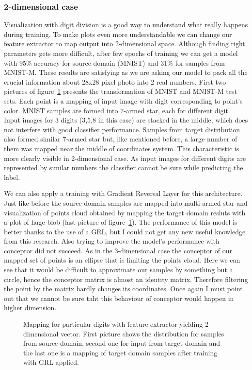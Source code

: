 \documentclass{article}
\begin{document}
\subsubsection{2-dimensional case}
\par
Visualization with digit division is a good way to understand what really happens during training. To make plots even more understandable we can change our feature extractor to map output into 2-dimensional space. Although finding right parameters gets more difficult, after few epochs of training we can get a model with 95\% accuracy for source domain (MNIST) and 31\% for samples from MNIST-M. These results are satisfying as we are asking our model to pack all the crucial information about 28x28 pixel photo into 2 real numbers. First two pictures of figure~\ref{fig:2D} presents the transformation of MNIST and MNIST-M test sets. Each point is a mapping of input image with digit corresponding to point's color. MNIST samples are formed into 7-armed star, each for different digit. Input images for 3 digits (3,5,8 in this case) are stacked in the middle, which does not interfere with good classifier performance. Samples from target distribution also formed similar 7-armed star but, like mentioned before, a large number of them was mapped near the middle of coordinates system. This characteristic is more clearly visible in 2-dimensional case. As input images for different digits are represented by similar numbers the classifier cannot be sure while predicting the label.
\par
We can also apply a training with Gradient Reversal Layer for this architecture. Just like before the source domain samples are mapped into multi-armed star and visualization of points cloud obtained by mapping the target domain resluts with a plot of huge blob (last picture of figure~\ref{fig:2D}). The performance of this model is better thanks to the use of a GRL, but I could not get any new useful knowledge from this research. Also trying to improve the model's performance with conceptor did not succeed. As in the 3-dimensional case the conceptor of our mapped set of points is an ellipse that is limiting the points cloud. Here we can see that it would be difficult to approximate our samples by something but a circle, hence the conceptor matrix is almost an identity matrix. Therefore filtering the point by the matrix hardly changes its coordinates. Once again I must point out that we cannot be sure taht this behaviour of conceptor would happen in higher dimension.

\begin{figure}[htb]%
\captionsetup[subfigure]{labelformat=empty}
    \centering
    \qquad
    \qquad
    \caption{Mapping for particular digits with feature extractor yielding 2-dimensional vector. First picture shows the distribution for samples from source domain, second one for input from target domain and the last one is a mapping of target domain samples after training with GRL applied.}%
    \label{fig:2D}%
\end{figure}
\end{document}
